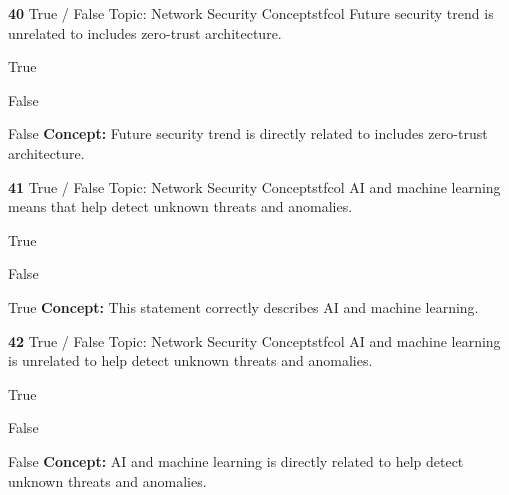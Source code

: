 \documentclass[10pt,a4paper]{article}
\begin{document}
\begin{qcard}{\color{white}\textbf{40} \hfill \small True / False \textbar{} Topic: Network Security Concepts}{tfcol}
Future security trend is unrelated to includes zero-trust architecture.

\begin{qoptions}
\item True
\item False
\end{qoptions}
\begin{explainbox}{False}
\textbf{Concept:} Future security trend is directly related to includes zero-trust architecture.
\end{explainbox}
\end{qcard}

\begin{qcard}{\color{white}\textbf{41} \hfill \small True / False \textbar{} Topic: Network Security Concepts}{tfcol}
AI and machine learning means that help detect unknown threats and anomalies.

\begin{qoptions}
\item True
\item False
\end{qoptions}
\begin{explainbox}{True}
\textbf{Concept:} This statement correctly describes AI and machine learning.
\end{explainbox}
\end{qcard}

\begin{qcard}{\color{white}\textbf{42} \hfill \small True / False \textbar{} Topic: Network Security Concepts}{tfcol}
AI and machine learning is unrelated to help detect unknown threats and anomalies.

\begin{qoptions}
\item True
\item False
\end{qoptions}
\begin{explainbox}{False}
\textbf{Concept:} AI and machine learning is directly related to help detect unknown threats and anomalies.
\end{explainbox}
\end{qcard}
\end{document}
